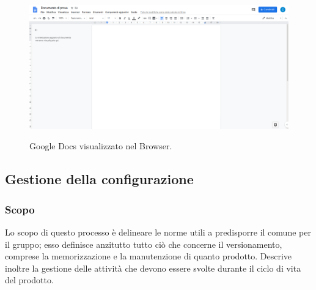 \documentclass[../norme-di-progetto.tex]{subfiles}
\begin{document}
\begin{figure}[H]
  \centering
  \includegraphics[width=15cm]{img/docs.png}
  \label{fig:github}
  \caption{Google Docs visualizzato nel Browser.}
\end{figure}

\subsection{Gestione della configurazione}
\subsubsection{Scopo}
Lo scopo di questo processo è delineare le norme utili a predisporre il  comune per il gruppo; esso definisce anzitutto tutto ciò che concerne il versionamento, comprese la memorizzazione e la manutenzione di quanto prodotto. Descrive inoltre la gestione delle attività che devono essere svolte durante il ciclo di vita del prodotto.
\end{document}
